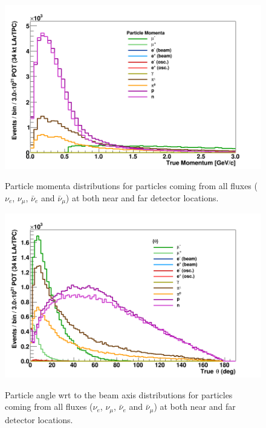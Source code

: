 \begin{figure}[h!]
  \centering
\includegraphics[scale=0.4]{figures/True_Momenta_per_Particle}
\label{fig:particle_momenta}
  \caption{Particle momenta distributions for particles coming from all fluxes ($\nu_e$, $\nu_\mu$, $\bar \nu_e$ and $\bar \nu_\mu$) at both near and far detector locations.  }
\end{figure}


\begin{figure}[h!]
  \centering
\includegraphics[scale=0.4]{figures/True_Theta_per_Particle}
\label{fig:particle_theta}
  \caption{Particle angle wrt to the beam axis distributions for particles coming from all fluxes ($\nu_e$, $\nu_\mu$, $\bar \nu_e$ and $\bar \nu_\mu$) at both near and far detector locations.  }
\end{figure}

\newpage


